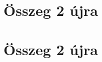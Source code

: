 \begin{spacing}{1.2}
\section*{Összeg 2 újra} \label{DBmatlabia12}
\Fa{

}
\vspace{0.5cm}
\newpage
\section*{Összeg 2 újra} \label{DBmatlabia12Mo}
\Mo{

}
\vspace{0.5cm}
\newpage

\end{spacing}


